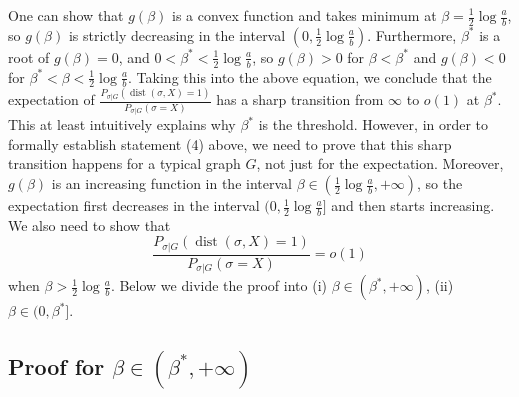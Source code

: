 \label{key}\documentclass[conference]{IEEEtran}
\DeclareMathOperator{\dist}{dist}
\begin{document}
One can show that $g(\beta)$ is a convex function and takes minimum at $\beta=\frac{1}{2}\log\frac{a}{b}$,
so $g(\beta)$ is strictly decreasing in the interval $(0,\frac{1}{2}\log\frac{a}{b})$.
Furthermore, $\beta^\ast$ is a root of $g(\beta)=0$, and $0<\beta^\ast<\frac{1}{2}\log\frac{a}{b}$,
so $g(\beta)>0$ for $\beta<\beta^\ast$ and $g(\beta)<0$ for $\beta^\ast<\beta<\frac{1}{2}\log\frac{a}{b}$.
Taking this into the above equation,
we conclude that the expectation of $\frac{P_{\sigma|G} ( \dist(\sigma, X) = 1 )}{P_{\sigma|G}(\sigma= X)}$
has a sharp transition from $\infty$ to $o(1)$ at $\beta^\ast$.
This at least intuitively explains why $\beta^\ast$ is the threshold. However, in order to formally establish statement (4) above, we need to prove that this sharp transition happens for a typical graph $G$, not just for the expectation.
Moreover, $g(\beta)$ is an increasing function in the interval $\beta\in(\frac{1}{2}\log\frac{a}{b}, +\infty)$, so the expectation first decreases in the interval $(0,\frac{1}{2}\log\frac{a}{b}]$ and then starts increasing. We also need to show that
$$
\frac{P_{\sigma|G} ( \dist(\sigma, X) = 1 )}{P_{\sigma|G}(\sigma= X)} 
= o(1)
$$
when $\beta>\frac{1}{2}\log\frac{a}{b}$.
Below we divide the proof into (i) $\beta\in(\beta^\ast,+\infty)$, (ii) $\beta\in(0,\beta^\ast]$.

\subsection{Proof for $\beta\in(\beta^*,+\infty)$}
\end{document}
